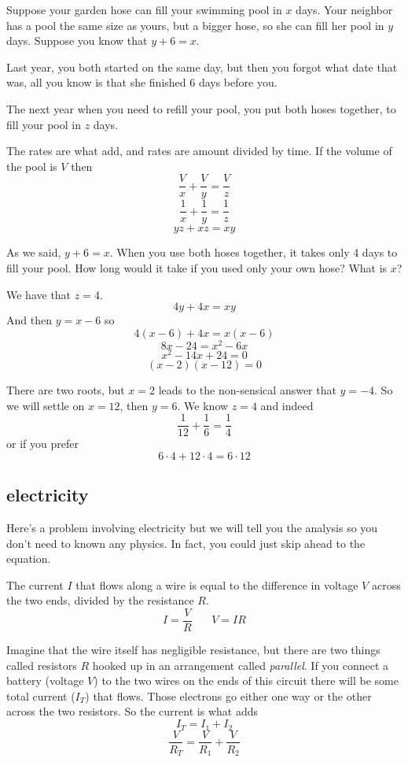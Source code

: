 \documentclass[11pt, oneside]{article}
\begin{document}
Suppose your garden hose can fill your swimming pool in $x$ days.  Your neighbor has a pool the same size as yours, but a bigger hose, so she can fill her pool in $y$ days.  Suppose you know that $y + 6 = x$.  

Last year, you both started on the same day, but then you forgot what date that was, all you know is that she finished 6 days before you.

The next year when you need to refill your pool, you put both hoses together, to fill your pool in $z$ days.

The rates are what add, and rates are amount divided by time.  If the volume of the pool is $V$ then
\[ \frac{V}{x} + \frac{V}{y} = \frac{V}{z} \]
\[ \frac{1}{x} + \frac{1}{y} = \frac{1}{z} \]
\[ yz + xz = xy \]

As we said, $y + 6 = x$.  When you use both hoses together, it takes only 4 days to fill your pool.  How long would it take if you used only your own hose?  What is $x$?

We have that $z = 4$.
\[ 4y + 4x = xy \]
And then $y = x - 6$ so
\[ 4(x - 6) + 4x = x(x - 6) \]
\[ 8x - 24 = x^2 - 6x \]
\[ x^2 - 14x + 24 = 0 \]
\[ (x - 2)(x - 12) = 0 \]

There are two roots, but $x = 2$ leads to the non-sensical answer that $y = -4$.  So we will settle on $x = 12$, then $y = 6$.  We know $z = 4$ and indeed
\[ \frac{1}{12} + \frac{1}{6} = \frac{1}{4} \]
or if you prefer
\[ 6 \cdot 4 + 12 \cdot 4 = 6 \cdot 12 \]

\subsection*{electricity}
Here's a problem involving electricity but we will tell you the analysis so you don't need to known any physics.  In fact, you could just skip ahead to the equation.

The current $I$ that flows along a wire is equal to the difference in voltage $V$ across the two ends, divided by the resistance $R$.
\[ I = \frac{V}{R} \ \ \ \ \ \ \ \ V = IR \]

Imagine that the wire itself has negligible resistance, but there are two things called resistors $R$ hooked up in an arrangement called \emph{parallel}.  If you connect a battery (voltage $V$) to the two wires on the ends of this circuit
there will be some total current ($I_T$) that flows.  Those electrons go either one way or the other across the two resistors.  So the current is what adds
\[ I_T = I_1 + I_2 \]
\[ \frac{V}{R_T} = \frac{V}{R_1} + \frac{V}{R_2} \]
\end{document}

